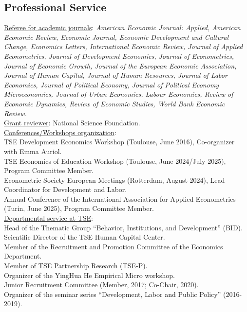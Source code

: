\documentclass[12pt,english]{article}
\begin{document}
\subsection*{Professional Service}

\noindent \underline{Referee for academic journals}: \textit{American Economic Journal: Applied, American Economic Review, Economic Journal, Economic Development and Cultural Change, Economics Letters, International Economic Review, Journal of Applied Econometrics, Journal of Development Economics, Journal of Econometrics, Journal of Economic Growth, Journal of the European Economic Association, Journal of Human Capital, Journal of Human Resources, Journal of Labor Economics, Journal of Political Economy,  Journal of Political Economy Microeconomics, Journal of Urban Economics, Labour Economics, Review of Economic Dynamics, Review of Economic Studies, World Bank Economic Review.} \\

\noindent \underline{Grant reviewer}: National Science Foundation. \\

\noindent \underline{Conferences/Workshops organization}:\\
TSE Development Economics Workshop (Toulouse, June 2016), Co-organizer with Emma Auriol.\vspace{0.2cm} \\
TSE Economics of Education Workshop (Toulouse, June 2024/July 2025), Program Committee Member. \vspace{0.2cm} \\
Econometric Society European Meetings (Rotterdam, August 2024), Lead Coordinator for Development and Labor.\vspace{0.2cm}\\
Annual Conference of the International Association for Applied Econometrics (Turin, June 2025), Program Committee Member.\\


\noindent \underline{Departmental service at TSE}: \\
Head of the Thematic Group ``Behavior, Institutions, and Development'' (BID).\vspace{0.2cm}\\
Scientific Director of the TSE Human Capital Center.\vspace{0.2cm}\\
Member of the Recruitment and Promotion Committee of the Economics Department.\vspace{0.2cm}\\
Member of TSE Partnership Research (TSE-P). \vspace{0.2cm}\\
Organizer of the YingHua He Empirical Micro workshop.\vspace{0.2cm}\\
Junior Recruitment Committee (Member, 2017; Co-Chair, 2020).\vspace{0.2cm}\\
Organizer of the seminar series ``Development, Labor and Public Policy'' (2016-2019).
\end{document}
